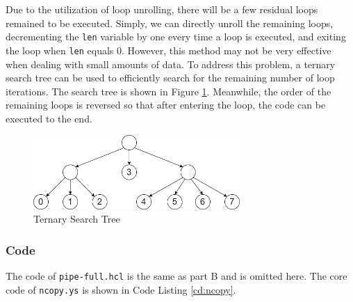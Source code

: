 \documentclass{article}
\begin{document}
Due to the utilization of loop unrolling, there will be a few residual loops remained to be executed. Simply, we can directly unroll the remaining loops, decrementing the \verb|len| variable by one every time a loop is executed, and exiting the loop when \verb|len| equals 0. However, this method may not be very effective when dealing with small amounts of data. To address this problem, a ternary search tree can be used to efficiently search for the remaining number of loop iterations. The search tree is shown in Figure \ref{fig:tree}. Meanwhile, the order of the remaining loops is reversed so that after entering the loop, the code can be executed to the end.

\begin{figure}[htbp] %
\centering %
\includegraphics[width=0.7\textwidth]{figure/tree.png} %
\caption{Ternary Search Tree} %
\label{fig:tree} %
\end{figure}
\subsubsection{Code}

The code of \verb|pipe-full.hcl| is the same as part B and is omitted here. The core code of \verb|ncopy.ys| is shown in Code Listing \ref{cd:ncopy}.
\end{document}
